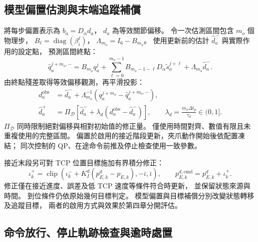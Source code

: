 \subsection{模型偏置估測與末端追蹤補償}
\label{subsec:model_bias_tcp_compensation}

將每步偏置表示為 $b_a=D_\alpha d_a$，
$d_a$ 為等效關節偏移。
令一次估測區間包含 $m_o$ 個物理步，
$B_\ell=\operatorname{diag}(\beta_i^\ell)$，
$\Lambda_{m_o}=I_6-B_{m_o}$。
使用更新前的估計 $\hat d_a^-$ 與實際作用的設定點，
預測區間終點：
\begin{equation}
    \hat q_a^{j+m_o,-}=
    B_{m_o}q_a^j+
    \sum_{\ell=0}^{m_o-1}
    B_{m_o-1-\ell}D_\alpha\tilde s_a^{j+\ell}
    +\Lambda_{m_o}\hat d_a^- .
    \label{eq:ch3_interval_offset_prediction}
\end{equation}
由終點殘差取得等效偏移觀測，再平滑投影：
\begin{equation}
    \begin{aligned}
        d_a^{\mathrm{obs}}&=\hat d_a^-+
        \Lambda_{m_o}^{-1}(q_a^{j+m_o}-\hat q_a^{j+m_o,-}),\\
        \hat d_a^+&=\Pi_{\mathcal D}
        [\hat d_a^-+\lambda_d(d_a^{\mathrm{obs}}-\hat d_a^-)],
        \qquad \lambda_d=\frac{m_o\Delta t_p}{\tau_d}\in(0,1].
    \end{aligned}
    \label{eq:ch3_interval_offset_update}
\end{equation}
$\Pi_{\mathcal D}$ 同時限制絕對偏移與相對初始值的修正量。
僅使用時間對齊、數值有限且未重複使用的完整區間。
偏置於啟用的接近階段更新，夾爪動作開始後依配置凍結；
同次控制的 QP、在途命令前推及停止檢查使用一致參數。

接近末段另可對 TCP 位置目標施加有界積分修正：
\begin{equation}
    \iota_k^+=\operatorname{clip}
    (\iota_k^-+K_I^d(p_{E,k}^d-p_{E,k}),-\bar\iota,\bar\iota),
    \qquad
    p_{E,k}^{d,\mathrm{cmd}}=p_{E,k}^d+\iota_k^+ .
    \label{eq:ch3_bounded_tcp_target_compensation}
\end{equation}
修正僅在接近進度、誤差及低 TCP 速度等條件符合時更新，
並保留狀態來源與時間。
到位條件仍依原始幾何目標判定。
模型偏置與目標補償分別改變狀態轉移及追蹤目標，
兩者的啟用方式與效果於第四章分開評估。

\subsection{命令放行、停止軌跡檢查與逾時處置}
\label{subsec:command_acceptance_stopping}

